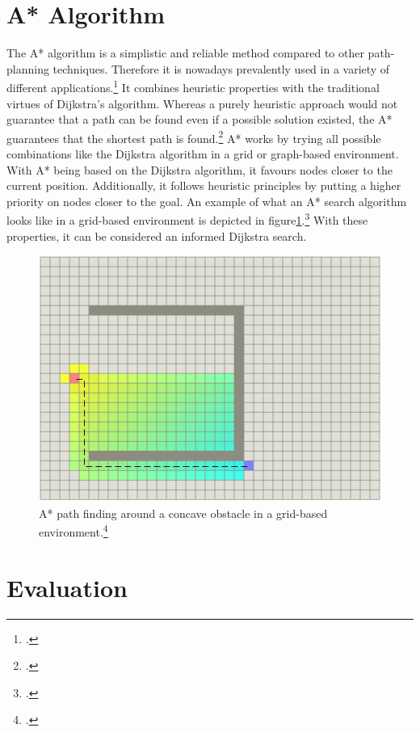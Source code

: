\section{A* Algorithm}

The A* algorithm is a simplistic and reliable method compared to other path-planning techniques. Therefore it is nowadays prevalently used in a variety of different applications.\footcite{Zammit2018}\newline
It combines heuristic properties with the traditional virtues of Dijkstra's algorithm. Whereas a purely heuristic approach would not guarantee that a path can be found even if a possible solution existed, the A* guarantees that the shortest path is found.\footcite{Sathyaraj2008}
A* works by trying all possible combinations like the Dijkstra algorithm in a grid or graph-based environment. With A* being based on the Dijkstra algorithm, it favours nodes closer to the current position. Additionally, it follows heuristic principles by putting a higher priority on nodes closer to the goal. An example of what an A* search algorithm looks like in a grid-based environment is depicted in figure\ref{fig:path_planning_Astar}.\footcite{standfordAStarComparison1997}\newline
With these properties, it can be considered an informed Dijkstra search.
  
\begin{figure}[h]
	\centering
	\includegraphics[width=0.7\linewidth]{img/AStarExample}
	\caption{A* path finding around a concave obstacle in a grid-based environment.\footcite{standfordAStarComparison1997}}
	\label{fig:path_planning_Astar}
\end{figure}

\section{Evaluation}

